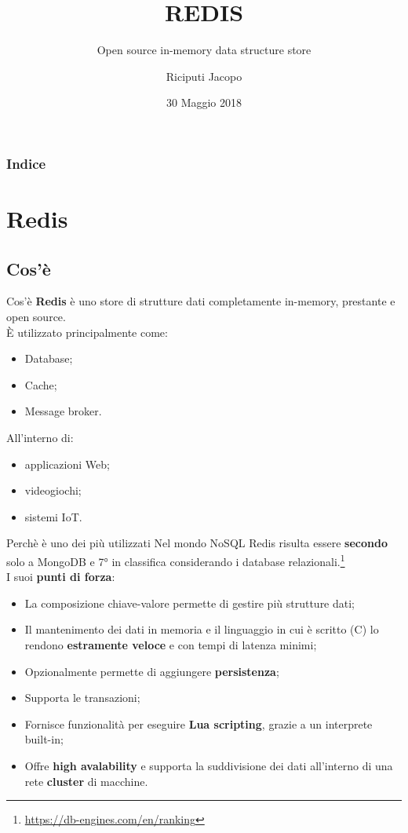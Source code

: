 \documentclass[xcolor=dvipsnames]{beamer}
\title[Introduzione a Redis]{REDIS}
\subtitle[Open source in-memory data structure store]{Open source in-memory data structure store}
\author[Riciputi Jacopo]{Riciputi Jacopo}
\date{30 Maggio 2018}
\begin{document}
\begin{frame}
  \titlepage
\end{frame}

\begin{frame}
\frametitle{Indice}
\tableofcontents
\end{frame}

  \section{Redis}
    \subsection{Cos'è}
      \begin{frame}{Cos'è}
          \textbf{Redis} è uno store di strutture dati completamente in-memory, prestante e open source. \\
          È utilizzato principalmente come:
          \begin{itemize}
            \item Database;
            \item Cache;
            \item Message broker.
          \end{itemize}

          All'interno di:
          \begin{itemize}
            \item applicazioni Web;
            \item videogiochi;
            \item sistemi IoT.
          \end{itemize}
      \end{frame}

      \begin{frame}{Perchè è uno dei più utilizzati}
        Nel mondo NoSQL Redis risulta essere \textbf{secondo} solo a
        MongoDB e 7° in classifica considerando i database relazionali.\footnote{\url{https://db-engines.com/en/ranking}} \\
        I suoi \textbf{punti di forza}:
        \begin{itemize}
          \item La composizione chiave-valore permette di gestire più strutture dati;
          \item Il mantenimento dei dati in memoria e il linguaggio in cui è scritto (C) lo rendono \textbf{estramente veloce}
                e con tempi di latenza minimi;
          \item Opzionalmente permette di aggiungere \textbf{persistenza};
          \item Supporta le transazioni;
          \item Fornisce funzionalità per eseguire \textbf{Lua scripting}, grazie a un interprete built-in;
          \item Offre \textbf{high avalability} e supporta la suddivisione dei dati all'interno di una rete \textbf{cluster} di macchine.
        \end{itemize}

      \end{frame}
\end{document}
